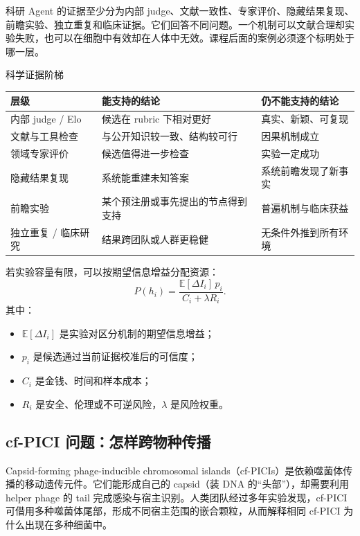 \documentclass[a4paper]{article}
\begin{document}
科研 Agent 的证据至少分为内部 judge、文献一致性、专家评价、隐藏结果复现、前瞻实验、独立重复和临床证据。它们回答不同问题。一个机制可以文献合理却实验失败，也可以在细胞中有效却在人体中无效。课程后面的案例必须逐个标明处于哪一层。

\begin{importantbox}{科学证据阶梯}
\begin{tabularx}{\textwidth}{L{0.22\textwidth}X X}
\toprule
层级 & 能支持的结论 & 仍不能支持的结论 \\
\midrule
内部 judge / Elo & 候选在 rubric 下相对更好 & 真实、新颖、可复现 \\
文献与工具检查 & 与公开知识较一致、结构较可行 & 因果机制成立 \\
领域专家评价 & 候选值得进一步检查 & 实验一定成功 \\
隐藏结果复现 & 系统能重建未知答案 & 系统前瞻发现了新事实 \\
前瞻实验 & 某个预注册或事先提出的节点得到支持 & 普遍机制与临床获益 \\
独立重复 / 临床研究 & 结果跨团队或人群更稳健 & 无条件外推到所有环境 \\
\bottomrule
\end{tabularx}
\end{importantbox}

若实验容量有限，可以按期望信息增益分配资源：
$$
P(h_i)=\frac{\mathbb{E}[\Delta I_i]\,p_i}
{C_i+\lambda R_i}.
$$
其中：
\begin{itemize}
  \item $\mathbb{E}[\Delta I_i]$ 是实验对区分机制的期望信息增益；
  \item $p_i$ 是候选通过当前证据校准后的可信度；
  \item $C_i$ 是金钱、时间和样本成本；
  \item $R_i$ 是安全、伦理或不可逆风险，$\lambda$ 是风险权重。
\end{itemize}


\subsection{cf-PICI 问题：怎样跨物种传播}

Capsid-forming phage-inducible chromosomal islands（cf-PICIs）是依赖噬菌体传播的移动遗传元件。它们能形成自己的 capsid（装 DNA 的“头部”），却需要利用 helper phage 的 tail 完成感染与宿主识别。人类团队经过多年实验发现，cf-PICI 可借用多种噬菌体尾部，形成不同宿主范围的嵌合颗粒，从而解释相同 cf-PICI 为什么出现在多种细菌中。
\end{document}
